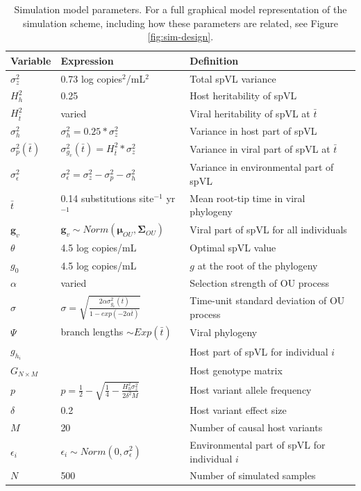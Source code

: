 \documentclass[11pt]{article}
\begin{document}
\begin{linenumbers}
\begin{table}[H]
	\caption{Simulation model parameters. For a full graphical model representation of the simulation scheme, including how these parameters are related, see Figure \ref{fig:sim-design}.}
	\begin{tabularx}{\linewidth}{p{1.5cm}ll} \toprule 
		Variable & Expression & Definition \\ \midrule 
		$\sigma^2_z$ &  0.73 log copies$^{2}$/mL$^{2}$ & Total spVL variance \\ 
		$H^2_h$ & 0.25 & Host heritability of spVL \\
		$H^2_{\bar{t}}$ & varied & Viral heritability of spVL at $\bar{t}$ \\
		$\sigma^2_{h}$ & $\sigma_{h}^2 = 0.25*\sigma_z^2$ & Variance in host part of spVL \\
		$\sigma^2_{p}(\bar{t})$ & $\sigma^2_{g_{v}}(\bar{t}) = H^2_{\bar{t}}*\sigma_z^2$ & Variance in viral part of spVL at $\bar{t}$ \\ 
		$\sigma^2_{\epsilon}$ & $\sigma_{\epsilon}^2 = \sigma_z^2 - \sigma^2_{p} - \sigma^2_{h}$ & Variance in environmental part of spVL \\ 
		$\bar{t}$ & 0.14 substitutions site$^{-1}$ yr$^{-1}$ & Mean root-tip time in viral phylogeny \\ 
		$\bm{g}_v$ & $\bm{g}_v \sim Norm(\bm{\mu}_{OU}, \boldsymbol{\Sigma}_{OU})$ & Viral part of spVL for all individuals \\ 
		$\theta$ & 4.5 log copies/mL & Optimal spVL value \\
		$g_{0}$ & 4.5 log copies/mL & $g$ at the root of the phylogeny  \\ 
		$\alpha$ & varied & Selection strength of OU process \\ 
		$\sigma$ & $\sigma = \sqrt{\frac{2\alpha\sigma^2_{g_{v}}(\bar{t})}{1 - exp(-2\alpha\bar{t})}}$ & Time-unit standard deviation of OU process \\ 
		$\Psi$ & branch lengths $\sim Exp(\bar{t})$ & Viral phylogeny \\ 
		$g_{h_i}$ & \makecell{$g_{h_i} = \delta \sum_{j = 1}^{j = M/2}{G_{ij}} - \\ \delta \sum_{j = M/2}^{j = M}{G_{ij}}$} & Host part of spVL for individual $i$ \\ 
		$G_{N \times M}$ & \makecell{$G_{ij} \sim Binom(2, p)\ \\ \forall i \in {1...N}, \forall j \in {1...M}$} & Host genotype matrix \\
		$p$ & $p = \frac{1}{2} - \sqrt{\frac{1}{4} - \frac{H_{h}^2\sigma^2_z}{2\delta^2M}}$ &  Host variant allele frequency \\ 
		$\delta$ & 0.2 & Host variant effect size \\ 
		$M$ & 20 & Number of causal host variants \\ 
		$\epsilon_i$ & $ \epsilon_i \sim Norm(0, \sigma^2_{\epsilon})$ & Environmental part of spVL for individual $i$ \\ 
		$N$ & 500 & Number of simulated samples \\ \bottomrule 
	\end{tabularx}
	\label{tab:sim-params}
\end{table}


\end{linenumbers}
\end{document}
